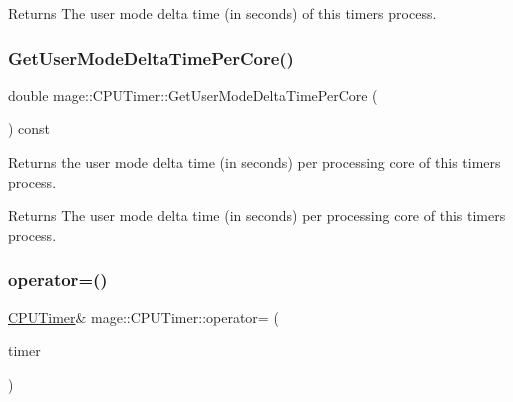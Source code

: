 \begin{DoxyReturn}{Returns}
The user mode delta time (in seconds) of this timer\textquotesingle{}s process. 
\end{DoxyReturn}
\hypertarget{classmage_1_1_c_p_u_timer_af6f972b523d00a83d5360f61bf0a1e50}{}\label{classmage_1_1_c_p_u_timer_af6f972b523d00a83d5360f61bf0a1e50} 
\subsubsection{\texorpdfstring{Get\+User\+Mode\+Delta\+Time\+Per\+Core()}{GetUserModeDeltaTimePerCore()}}
{\footnotesize\ttfamily double mage\+::\+C\+P\+U\+Timer\+::\+Get\+User\+Mode\+Delta\+Time\+Per\+Core (\begin{DoxyParamCaption}{ }\end{DoxyParamCaption}) const}

Returns the user mode delta time (in seconds) per processing core of this timer\textquotesingle{}s process.

\begin{DoxyReturn}{Returns}
The user mode delta time (in seconds) per processing core of this timer\textquotesingle{}s process. 
\end{DoxyReturn}
\hypertarget{classmage_1_1_c_p_u_timer_aa453ec0f437762bff5c33ea344329d10}{}\label{classmage_1_1_c_p_u_timer_aa453ec0f437762bff5c33ea344329d10} 
\subsubsection{\texorpdfstring{operator=()}{operator=()}\hspace{0.1cm}{\footnotesize\ttfamily [1/2]}}
{\footnotesize\ttfamily \hyperlink{classmage_1_1_c_p_u_timer}{C\+P\+U\+Timer}\& mage\+::\+C\+P\+U\+Timer\+::operator= (\begin{DoxyParamCaption}\item[{const \hyperlink{classmage_1_1_c_p_u_timer}{C\+P\+U\+Timer} \&}]{timer }\end{DoxyParamCaption})\hspace{0.3cm}{\ttfamily [default]}}

